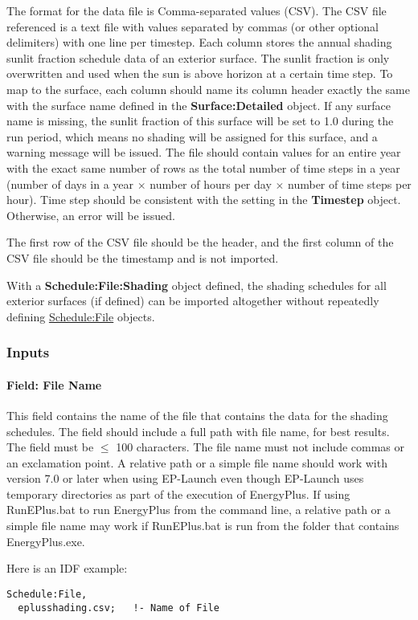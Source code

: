 The format for the data file is Comma-separated values (CSV). The CSV file referenced is a text file with values separated by commas (or other optional delimiters) with one line per timestep. Each column stores the annual shading sunlit fraction schedule data of an exterior surface. The sunlit fraction is only overwritten and used when the sun is above horizon at a certain time step. To map to the surface, each column should name its column header exactly the same with the surface name defined in the \textbf{Surface:Detailed} object. If any surface name is missing, the sunlit fraction of this surface will be set to 1.0 during the run period, which means no shading will be assigned for this surface, and a warning message will be issued. The file should contain values for an entire year with the exact same number of rows as the total number of time steps in a year (number of days in a year $\times$ number of hours per day $\times$ number of time steps per hour). Time step should be consistent with the setting in the \textbf{Timestep} object. Otherwise, an error will be issued.

The first row of the CSV file should be the header, and the first column of the CSV file should be the timestamp and is not imported.

With a \textbf{Schedule:File:Shading} object defined, the shading schedules for all exterior surfaces (if defined) can be imported altogether without repeatedly defining \hyperref[schedulefile]{Schedule:File} objects.

\subsubsection{Inputs}\label{inputs-schedule-file-shading}

\paragraph{Field: File Name}\label{schedulefileshading-field-file-name}

This field contains the name of the file that contains the data for the shading schedules. The field should include a full path with file name, for best results. The field must be \(\le\) 100 characters. The file name must not include commas or an exclamation point. A relative path or a simple file name should work with version 7.0 or later when using EP-Launch even though EP-Launch uses temporary directories as part of the execution of EnergyPlus. If using RunEPlus.bat to run EnergyPlus from the command line, a relative path or a simple file name may work if RunEPlus.bat is run from the folder that contains EnergyPlus.exe.

Here is an IDF example:

\begin{lstlisting}
Schedule:File,
  eplusshading.csv;   !- Name of File
\end{lstlisting}
